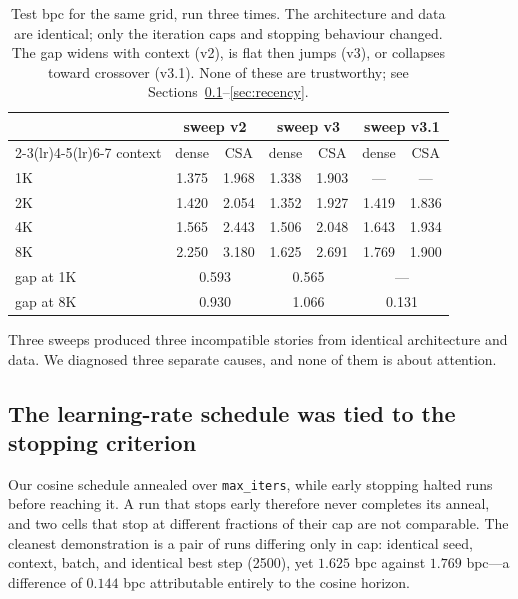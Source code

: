 \documentclass[11pt]{article}
\begin{document}
\begin{table}[t]
\centering
\small
\begin{tabular}{lcccccc}
\toprule
& \multicolumn{2}{c}{sweep v2} & \multicolumn{2}{c}{sweep v3} & \multicolumn{2}{c}{sweep v3.1} \\
\cmidrule(lr){2-3}\cmidrule(lr){4-5}\cmidrule(lr){6-7}
context & dense & CSA & dense & CSA & dense & CSA \\
\midrule
1K & 1.375 & 1.968 & 1.338 & 1.903 & --- & --- \\
2K & 1.420 & 2.054 & 1.352 & 1.927 & 1.419 & 1.836 \\
4K & 1.565 & 2.443 & 1.506 & 2.048 & 1.643 & 1.934 \\
8K & 2.250 & 3.180 & 1.625 & 2.691 & 1.769 & 1.900 \\
\midrule
gap at 1K & \multicolumn{2}{c}{0.593} & \multicolumn{2}{c}{0.565} & \multicolumn{2}{c}{---} \\
gap at 8K & \multicolumn{2}{c}{0.930} & \multicolumn{2}{c}{1.066} & \multicolumn{2}{c}{0.131} \\
\bottomrule
\end{tabular}
\caption{Test bpc for the same grid, run three times. The architecture and
data are identical; only the iteration caps and stopping behaviour changed.
The gap widens with context (v2), is flat then jumps (v3), or collapses toward
crossover (v3.1). None of these are trustworthy; see
Sections~\ref{sec:lrhorizon}--\ref{sec:recency}.}
\label{tab:sweeps}
\end{table}

Three sweeps produced three incompatible stories from identical architecture and
data. We diagnosed three separate causes, and none of them is about attention.

\subsection{The learning-rate schedule was tied to the stopping criterion}
\label{sec:lrhorizon}

Our cosine schedule annealed over \texttt{max\_iters}, while early stopping
halted runs before reaching it. A run that stops early therefore never completes
its anneal, and two cells that stop at different fractions of their cap are not
comparable. The cleanest demonstration is a pair of runs differing only in cap:
identical seed, context, batch, and identical best step (2500), yet
$1.625$ bpc against $1.769$ bpc---a difference of $0.144$ bpc attributable
entirely to the cosine horizon.
\end{document}
